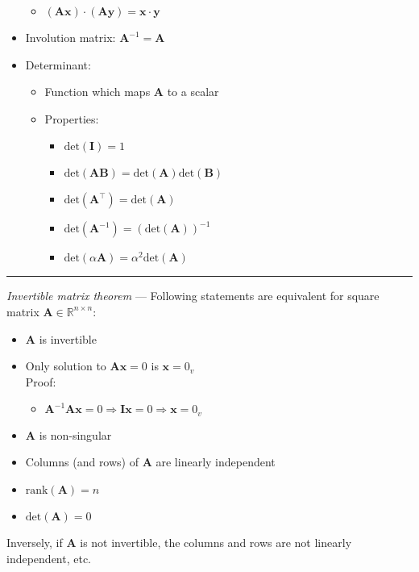 \begin{itemize}
\begin{itemize}
        \item $(\boldsymbol{A}\boldsymbol{x}) \cdot (\boldsymbol{A}\boldsymbol{y}) = \boldsymbol{x} \cdot \boldsymbol{y}$
    \end{itemize}
    \item Involution matrix: $\boldsymbol{A}^{-1} = \boldsymbol{A}$
    \item Determinant: 
    \begin{itemize}
        \item Function which maps $\boldsymbol{A}$ to a scalar
        \item Properties:
        \begin{multicols}{2}
        \begin{itemize}
            \item $\textrm{det}(\boldsymbol{I}) = 1$
            \item $\textrm{det}(\boldsymbol{A}\boldsymbol{B}) = \textrm{det}(\boldsymbol{A})\textrm{det}(\boldsymbol{B})$
            \item $\textrm{det}(\boldsymbol{A}^\intercal) = \textrm{det}(\boldsymbol{A})$
            \item $\textrm{det}(\boldsymbol{A}^{-1}) = (\textrm{det}(\boldsymbol{A}))^{-1}$
            \item $\textrm{det}(\alpha\boldsymbol{A}) = \alpha^2\textrm{det}(\boldsymbol{A})$
        \end{itemize}
        \end{multicols}
    \end{itemize}
    
\end{itemize}

{\color{lightgray}\hrule height 0.001mm}

\emph{Invertible matrix theorem} --- Following statements are equivalent for square matrix $\boldsymbol{A} \in \mathbb{R}^{n \times n}$: 
\begin{itemize}
    \item $\boldsymbol{A}$ is invertible
    \item Only solution to $\boldsymbol{A}\boldsymbol{x} = 0$ is $\boldsymbol{x} = 0_v$\\
    Proof:
    \begin{itemize}
        \item $\boldsymbol{A}^{-1} \boldsymbol{A} \boldsymbol{x} = 0 \Rightarrow \boldsymbol{I} \boldsymbol{x} = 0 \Rightarrow \boldsymbol{x} = 0_v$
    \end{itemize}
    \item $\boldsymbol{A}$ is non-singular
    \item Columns (and rows) of $\boldsymbol{A}$ are linearly independent
    \item $\textrm{rank}(\boldsymbol{A}) = n$
    \item $\textrm{det}(\boldsymbol{A}) = 0$
\end{itemize}
Inversely, if $\boldsymbol{A}$ is not invertible, the columns and rows are not linearly independent, etc. 

